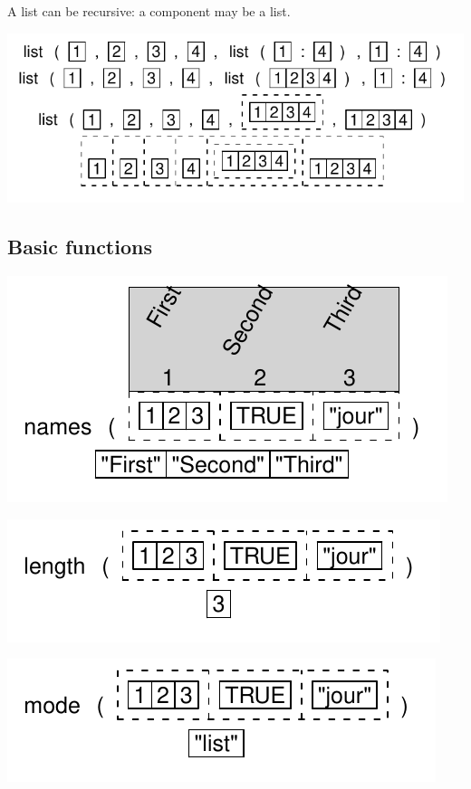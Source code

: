 \documentclass[pdflatex]{article}
\begin{document}
A list can be recursive: a component may be a list.

\includegraphics{list_complex.pdf}


\subsection{Basic functions}

\includegraphics{list_names}

\includegraphics{list_length}

\includegraphics{list_mode}
\end{document}

